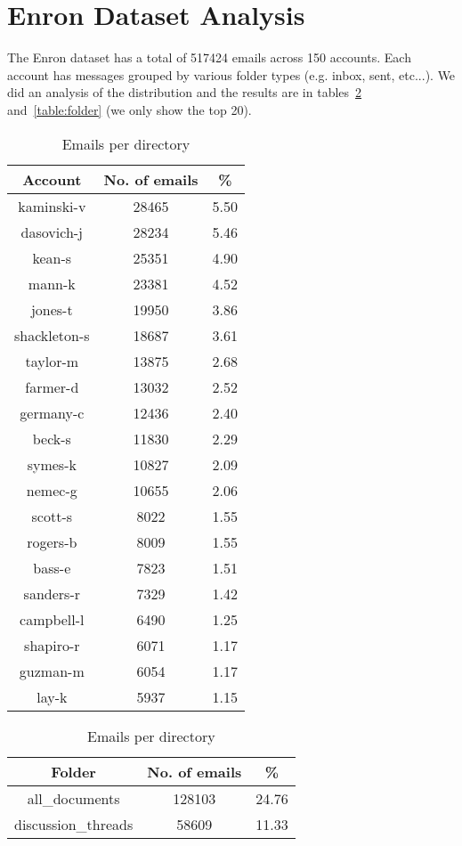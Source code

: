 \documentclass[senior,oneside]{UIUC}
\begin{document}
\section{Enron Dataset Analysis}

The Enron dataset has  a total of 517424 emails across 150 accounts. Each account has messages grouped by various folder types (e.g. inbox, sent, etc...). We did an analysis of the distribution and the results are in tables~\ref{table:person} and~\ref{table:folder} (we only show the top 20).

\begin{table}
\parbox{.45\linewidth}{
\begin{tabular}{c c c }
\hline \hline
Account & No. of emails & \% \\ [0.5ex]
\hline
kaminski-v & 28465 & 5.50 \\
dasovich-j & 28234 & 5.46 \\
kean-s & 25351 & 4.90 \\
mann-k & 23381 & 4.52 \\
jones-t & 19950 & 3.86 \\
shackleton-s & 18687 & 3.61 \\
taylor-m & 13875 & 2.68 \\
farmer-d & 13032 & 2.52 \\
germany-c & 12436 & 2.40 \\
beck-s & 11830 & 2.29 \\
symes-k & 10827 & 2.09 \\
nemec-g & 10655 & 2.06 \\
scott-s & 8022 & 1.55 \\
rogers-b & 8009 & 1.55 \\
bass-e & 7823 & 1.51 \\
sanders-r & 7329 & 1.42 \\
campbell-l & 6490 & 1.25 \\
shapiro-r & 6071 & 1.17 \\
guzman-m & 6054 & 1.17 \\
lay-k & 5937 & 1.15 
\\\end{tabular}
\caption{Emails per directory}
\label{table:person}
}
\parbox{.45\linewidth}{
\begin{tabular}{c c c }
\hline \hline
Folder & No. of emails & \% \\ [0.5ex]
\hline
all\_documents & 128103 & 24.76 \\
discussion\_threads & 58609 & 11.33 \\

\end{tabular}}
\end{table}
\end{document}
